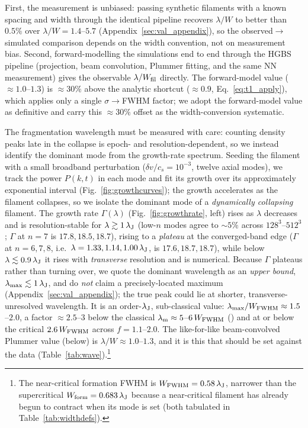 \documentclass[usenatbib,twoside,twocolumn]{mnras}
\begin{document}
First, the measurement is unbiased: passing synthetic filaments with a known spacing and width through the identical pipeline recovers $\lambda/W$ to better than $0.5\%$ over $\lambda/W=1.4$--$5.7$ (Appendix~\ref{sec:val_appendix}), so the observed$\to$simulated comparison depends on the width convention, not on measurement bias. Second, forward-modelling the simulations end to end through the HGBS pipeline (projection, beam convolution, Plummer fitting, and the same NN measurement) gives the observable $\lambda/W_{\rm fil}$ directly. The forward-model value ($\approx1.0$--$1.3$) is $\approx30\%$ above the analytic shortcut ($\approx0.9$, Eq.~\ref{eq:t1_apply}), which applies only a single $\sigma\!\to\!$FWHM factor; we adopt the forward-model value as definitive and carry this $\approx30\%$ offset as the width-conversion systematic.

The fragmentation wavelength must be measured with care: counting density peaks late in the collapse is epoch- and resolution-dependent, so we instead identify the dominant mode from the growth-rate spectrum. Seeding the filament with a small broadband perturbation ($\delta v/c_s=10^{-3}$, twelve axial modes), we track the power $P(k,t)$ in each mode and fit its growth over its approximately exponential interval (Fig.~\ref{fig:growthcurves}); the growth accelerates as the filament collapses, so we isolate the dominant mode of a \emph{dynamically collapsing} filament. The growth rate $\Gamma(\lambda)$ (Fig.~\ref{fig:growthrate}, left) rises as $\lambda$ decreases and is resolution-stable for $\lambda\gtrsim1\,\lambda_{\rm J}$ (low-$n$ modes agree to $\sim5\%$ across $128^3$--$512^3$; $\Gamma$ at $n=7$ is $17.8,18.5,18.7$), rising to a \emph{plateau} at the converged-band edge ($\Gamma$ at $n=6,7,8$, i.e.\ $\lambda=1.33,1.14,1.00\,\lambda_{\rm J}$, is $17.6,18.7,18.7$), while below $\lambda\lesssim0.9\,\lambda_{\rm J}$ it rises with \emph{transverse} resolution and is numerical. Because $\Gamma$ plateaus rather than turning over, we quote the dominant wavelength as an \emph{upper bound}, $\lambda_{\rm max}\lesssim1\,\lambda_{\rm J}$, and do \emph{not} claim a precisely-located maximum (Appendix~\ref{sec:val_appendix}); the true peak could lie at shorter, transverse-unresolved wavelength. It is an order-$\lambda_{\rm J}$, sub-classical value: $\lambda_{\rm max}/W_{\rm FWHM}\approx1.5$--$2.0$, a factor $\approx2.5$--$3$ below the classical $\lambda_{\rm m}\approx5$--$6\,W_{\rm FWHM}$ (\citealt{Fischera2012}) and at or below the critical $2.6\,W_{\rm FWHM}$ across $f=1.1$--$2.0$. The like-for-like beam-convolved Plummer value (below) is $\lambda/W\approx1.0$--$1.3$, and it is this that should be set against the data (Table~\ref{tab:wave}).\footnote{The near-critical formation FWHM is $W_{\rm FWHM}=0.58\,\lambda_{\rm J}$, narrower than the supercritical $W_{\rm form}=0.683\,\lambda_{\rm J}$ because a near-critical filament has already begun to contract when its mode is set (both tabulated in Table~\ref{tab:widthdefs}).}
\end{document}
